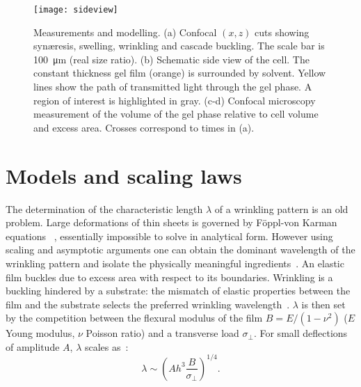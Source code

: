 \documentclass[twocolumn,superscriptaddress,showpacs,preprintnumbers,
amsmath,amssymb,prl]{revtex4-1}
\begin{document}
\begin{figure}
	\texttt{[image: sideview]}
	\caption{Measurements and modelling. (a) Confocal $(x,z)$ cuts showing syn\ae{}resis, swelling, wrinkling and cascade buckling. The scale bar is \SI{100}{\micro\metre} (real size ratio). (b) Schematic side view of the cell. The constant thickness gel film (orange) is surrounded by solvent. Yellow lines show the path of transmitted light through the gel phase. A region of interest is highlighted in gray. (c-d) Confocal microscopy measurement of the volume of the gel phase relative to cell volume and excess area. Crosses correspond to times in (a).}
	\label{fig:sideview}
\end{figure}

\section*{Models and scaling laws}


The determination of the characteristic length $\lambda$ of a wrinkling pattern is an old problem. Large deformations of thin sheets is governed by F\"{o}ppl-von Karman equations ~\cite{landau1986},  essentially impossible to solve in analytical form. However using scaling and asymptotic arguments one can obtain the dominant wavelength of the wrinkling pattern and isolate the physically meaningful ingredients~\cite{Cerda2003}. An elastic film buckles due to excess area with respect to its boundaries. Wrinkling is a buckling hindered by a substrate: the mismatch of elastic properties between the film and the substrate selects the preferred wrinkling wavelength~\cite{Gough1940, Bijlaard1946}. $\lambda$ is then set by the competition between the flexural modulus of the film $B=E/(1-\nu^2)$ ($E$ Young modulus, $\nu$ Poisson ratio) and a transverse load $\sigma_\perp$. For small deflections of  amplitude $A$, $\lambda$ scales as~\cite{Vella2009,Kolinski2009}: 
%
\begin{equation}
\lambda \sim \left( A h^3 \frac{B}{\sigma_{\perp}} \right)^{1/4}.
\label{eq:lstar}
\end{equation}


\end{document}
